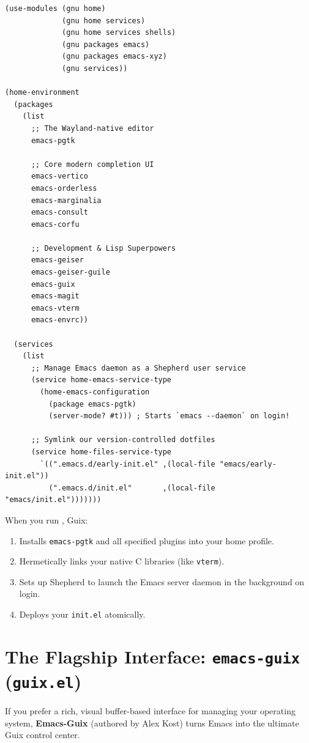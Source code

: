 \begin{lstlisting}[style=guixscheme]
(use-modules (gnu home)
             (gnu home services)
             (gnu home services shells)
             (gnu packages emacs)
             (gnu packages emacs-xyz)
             (gnu services))

(home-environment
  (packages
    (list
      ;; The Wayland-native editor
      emacs-pgtk

      ;; Core modern completion UI
      emacs-vertico
      emacs-orderless
      emacs-marginalia
      emacs-consult
      emacs-corfu

      ;; Development & Lisp Superpowers
      emacs-geiser
      emacs-geiser-guile
      emacs-guix
      emacs-magit
      emacs-vterm
      emacs-envrc))

  (services
    (list
      ;; Manage Emacs daemon as a Shepherd user service
      (service home-emacs-service-type
        (home-emacs-configuration
          (package emacs-pgtk)
          (server-mode? #t))) ; Starts `emacs --daemon` on login!

      ;; Symlink our version-controlled dotfiles
      (service home-files-service-type
        `((".emacs.d/early-init.el" ,(local-file "emacs/early-init.el"))
          (".emacs.d/init.el"       ,(local-file "emacs/init.el")))))))
\end{lstlisting}

When you run , Guix:
\begin{enumerate}
  \item Installs \texttt{emacs-pgtk} and all specified plugins into your home profile.
  \item Hermetically links your native C libraries (like \texttt{vterm}).
  \item Sets up Shepherd to launch the Emacs server daemon in the background on login.
  \item Deploys your \texttt{init.el} atomically.
\end{enumerate}

\section{The Flagship Interface: \texttt{emacs-guix} (\texttt{guix.el})}

If you prefer a rich, visual buffer-based interface for managing your operating system, \textbf{Emacs-Guix} (authored by Alex Kost) turns Emacs into the ultimate Guix control center.

